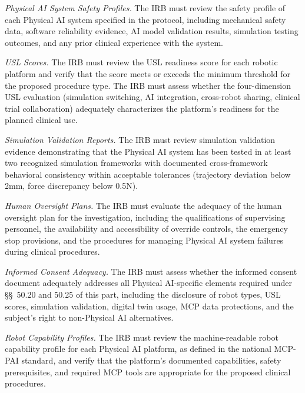 \documentclass[11pt]{article}
\begin{document}
\begin{description}[leftmargin=1.0cm,style=sameline]
\item[(1)] \textit{Physical AI System Safety Profiles.} The IRB must review the safety profile of each Physical AI system specified in the protocol, including mechanical safety data, software reliability evidence, AI model validation results, simulation testing outcomes, and any prior clinical experience with the system.
\item[(2)] \textit{USL Scores.} The IRB must review the USL readiness score for each robotic platform and verify that the score meets or exceeds the minimum threshold for the proposed procedure type. The IRB must assess whether the four-dimension USL evaluation (simulation switching, AI integration, cross-robot sharing, clinical trial collaboration) adequately characterizes the platform's readiness for the planned clinical use.
\item[(3)] \textit{Simulation Validation Reports.} The IRB must review simulation validation evidence demonstrating that the Physical AI system has been tested in at least two recognized simulation frameworks with documented cross-framework behavioral consistency within acceptable tolerances (trajectory deviation below 2mm, force discrepancy below 0.5N).
\item[(4)] \textit{Human Oversight Plans.} The IRB must evaluate the adequacy of the human oversight plan for the investigation, including the qualifications of supervising personnel, the availability and accessibility of override controls, the emergency stop provisions, and the procedures for managing Physical AI system failures during clinical procedures.
\item[(5)] \textit{Informed Consent Adequacy.} The IRB must assess whether the informed consent document adequately addresses all Physical AI-specific elements required under \S\S~50.20 and 50.25 of this part, including the disclosure of robot types, USL scores, simulation validation, digital twin usage, MCP data protections, and the subject's right to non-Physical AI alternatives.
\item[(6)] \textit{Robot Capability Profiles.} The IRB must review the machine-readable robot capability profile for each Physical AI platform, as defined in the national MCP-PAI standard, and verify that the platform's documented capabilities, safety prerequisites, and required MCP tools are appropriate for the proposed clinical procedures.
\end{description}
\end{document}
